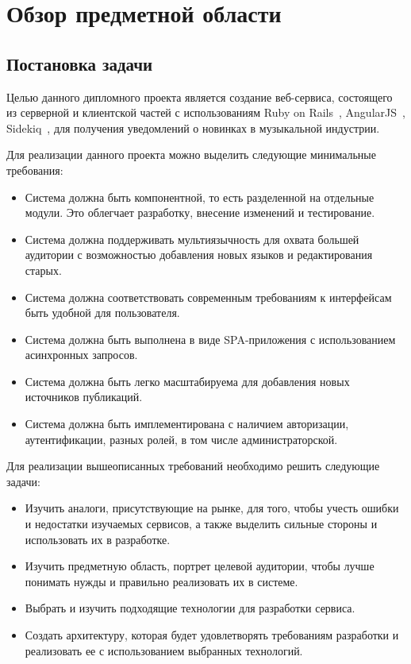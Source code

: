 \section{Обзор предметной области}
\label{sec:domain}

\subsection{Постановка задачи}
\label{sub:domain:problem_formulation}
Целью данного дипломного проекта является создание веб-сервиса, состоящего из серверной и клиентской частей с использованиям Ruby on Rails~\cite{rails_guides}, AngularJS~\cite{angularjs_doc}, Sidekiq~\cite{sidekiq_doc}, для получения уведомлений о новинках в музыкальной индустрии.

Для реализации данного проекта можно выделить следующие минимальные требования:

\begin{itemize}
  \item Система должна быть компонентной, то есть разделенной на отдельные модули. Это облегчает разработку, внесение изменений и тестирование.
  \item Система должна поддерживать мультиязычность для охвата большей аудитории с возможностью добавления новых языков и редактирования старых.
  \item Система должна соответствовать современным требованиям к интерфейсам быть удобной для пользователя.
  \item Система должна быть выполнена в виде SPA-приложения с использованием асинхронных запросов.
  \item Система должна быть легко масштабируема для добавления новых источников публикаций.
  \item Система должна быть имплементирована с наличием авторизации, аутентификации, разных ролей, в том числе администраторской.
\end{itemize}

Для реализации вышеописанных требований необходимо решить следующие задачи:

\begin{itemize}
  \item Изучить аналоги, присутствующие на рынке, для того, чтобы учесть ошибки и недостатки изучаемых сервисов, а также выделить сильные стороны и использовать их в разработке.
  \item Изучить предметную область, портрет целевой аудитории, чтобы лучше понимать нужды и правильно реализовать их в системе.
  \item Выбрать и изучить подходящие технологии для разработки сервиса.
  \item Создать архитектуру, которая будет удовлетворять требованиям разработки и реализовать ее с использованием выбранных технологий.
\end{itemize}

